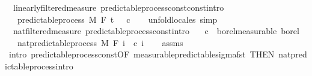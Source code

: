 \begin{isabellebody}
\endisatagproof
{\isafoldproof}%
%
\isadelimproof
\isanewline
%
\endisadelimproof
\isanewline
{}\isamarkupfalse%
\ {\isacharparenleft}{\kern0pt}\ linearly{\isacharunderscore}{\kern0pt}filtered{\isacharunderscore}{\kern0pt}measure{\isacharparenright}{\kern0pt}\ predictable{\isacharunderscore}{\kern0pt}process{\isacharunderscore}{\kern0pt}const{\isacharunderscore}{\kern0pt}const{\isacharbrackleft}{\kern0pt}intro{\isacharbrackright}{\kern0pt}{\isacharcolon}{\kern0pt}\isanewline
\ \ \ {\isachardoublequoteopen}predictable{\isacharunderscore}{\kern0pt}process\ M\ F\ t\ {\isacharparenleft}{\kern0pt}{\isasymlambda}{\isacharunderscore}{\kern0pt}\ {\isacharunderscore}{\kern0pt}{\isachardot}{\kern0pt}\ c{\isacharparenright}{\kern0pt}{\isachardoublequoteclose}\isanewline
%
\isadelimproof
\ \ %
\endisadelimproof
%
\isatagproof
{}\isamarkupfalse%
\ {\isacharparenleft}{\kern0pt}unfold{\isacharunderscore}{\kern0pt}locales{\isacharparenright}{\kern0pt}\ simp%
\endisatagproof
{\isafoldproof}%
%
\isadelimproof
\isanewline
%
\endisadelimproof
\isanewline
{}\isamarkupfalse%
\ {\isacharparenleft}{\kern0pt}\ nat{\isacharunderscore}{\kern0pt}filtered{\isacharunderscore}{\kern0pt}measure{\isacharparenright}{\kern0pt}\ predictable{\isacharunderscore}{\kern0pt}process{\isacharunderscore}{\kern0pt}const{\isacharprime}{\kern0pt}{\isacharbrackleft}{\kern0pt}intro{\isacharbrackright}{\kern0pt}{\isacharcolon}{\kern0pt}\isanewline
\ \ \ {\isachardoublequoteopen}c\ {\isasymin}\ borel{\isacharunderscore}{\kern0pt}measurable\ borel{\isachardoublequoteclose}\isanewline
\ \ \ {\isachardoublequoteopen}nat{\isacharunderscore}{\kern0pt}predictable{\isacharunderscore}{\kern0pt}process\ M\ F\ {\isacharparenleft}{\kern0pt}{\isasymlambda}i\ {\isacharunderscore}{\kern0pt}{\isachardot}{\kern0pt}\ c\ i{\isacharparenright}{\kern0pt}{\isachardoublequoteclose}\isanewline
%
\isadelimproof
\ \ %
\endisadelimproof
%
\isatagproof
{}\isamarkupfalse%
\ assms\ \isamarkupfalse%
\ {\isacharparenleft}{\kern0pt}intro\ predictable{\isacharunderscore}{\kern0pt}process{\isacharunderscore}{\kern0pt}const{\isacharbrackleft}{\kern0pt}OF\ measurable{\isacharunderscore}{\kern0pt}predictable{\isacharunderscore}{\kern0pt}sigma{\isacharunderscore}{\kern0pt}fst{\isacharprime}{\kern0pt}{\isacharcomma}{\kern0pt}\ THEN\ nat{\isacharunderscore}{\kern0pt}predictable{\isacharunderscore}{\kern0pt}process{\isachardot}{\kern0pt}intro{\isacharbrackright}{\kern0pt}{\isacharparenright}{\kern0pt}%

\end{isabellebody}

